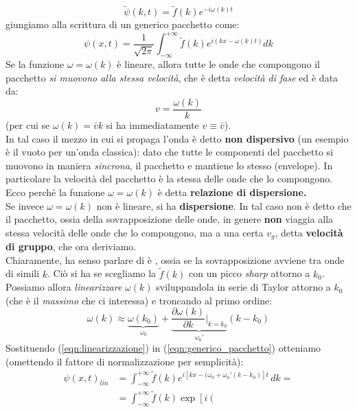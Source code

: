 \documentclass[../../FisicaTeorica.tex]{subfiles}
\begin{document}
\begin{expl}
\[
\tilde{\psi}(k,t)=\tilde{f}(k)e^{-i\omega(k)t}
\]
giungiamo alla scrittura di un generico pacchetto come:
\begin{equation}
\psi(x,t)=\frac{1}{\sqrt{2\pi}}\int_{-\infty}^{+\infty}\tilde{f}(k) e^{i(kx-\omega(k)t)}dk
\label{eqn:generico_pacchetto}
\end{equation}
Se la funzione $\omega=\omega(k)$ è lineare, allora tutte le onde che compongono il pacchetto \textit{si muovono alla stessa velocità}, che è detta \textit{velocità di fase} ed è data da:
\[
v=\frac{\omega(k)}{k}
\]
(per cui se $\omega(k)=\bar{v}k$ si ha immediatamente $v\equiv \bar{v}$).\\
In tal caso il mezzo in cui si propaga l'onda è detto \textbf{non dispersivo} (un esempio è il vuoto per un'onda classica): dato che tutte le componenti del pacchetto si muovono in maniera \textit{sincrona}, il pacchetto  e mantiene lo stesso  (envelope). In particolare la velocità del pacchetto è la stessa delle onde che lo compongono. Ecco perché la funzione $\omega = \omega(k)$ è detta \textbf{relazione di dispersione.}\\
Se invece $\omega=\omega(k)$ non è lineare, si ha \textbf{dispersione}. In tal caso non è detto che il pacchetto, ossia  della sovrapposizione delle onde, in genere \textbf{non} viaggia alla stessa velocità delle onde che lo compongono, ma a una certa $v_g$, detta \textbf{velocità di gruppo}, che ora deriviamo.\\
Chiaramente, ha senso parlare di  è , ossia se la sovrapposizione avviene tra onde di simili $k$. Ciò si ha se scegliamo la $\tilde{f}(k)$ con un picco \textit{sharp} attorno a $k_0$. Possiamo allora \textit{linearizzare} $\omega(k)$ sviluppandola in serie di Taylor attorno a $k_0$ (che è il \textit{massimo} che ci interessa) e troncando al primo ordine:
\begin{equation}
\omega(k)\approx \underbrace{\omega(k_0)}_{\omega_0} + \underbrace{\frac{\partial \omega(k)}{\partial k}\Big|_{k=k_0}}_{\omega_0'}(k-k_0)
\label{eqn:linearizzazione}
\end{equation}
Sostituendo (\ref{eqn:linearizzazione}) in (\ref{eqn:generico_pacchetto}) otteniamo (omettendo il fattore di normalizzazione per semplicità):
\begin{align*}
\psi(x,t)_{lin}&=\int_{-\infty}^{+\infty}\tilde{f}(k)e^{i[kx-(\omega_0+\omega_0'(k-k_0)]t}\,dk=\\
&=\int_{-\infty}^{+\infty}\tilde{f}(k)\exp\left [i\left(

\end{align*}
\end{expl}
\end{document}
